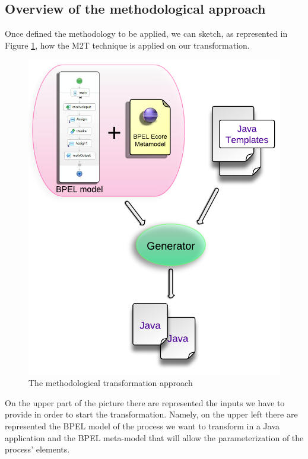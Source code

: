 \subsection{Overview of the methodological approach}
\label{MethodologyOverview}
Once defined the methodology to be applied, we can sketch, as represented in Figure \ref{fig:TransformationApproach}, how the M2T technique is applied on our transformation.
\begin{figure}[ht]
  \begin{center}
    \includegraphics[scale=0.9]{pictures/TransformationApproach.png}
    \caption{The methodological transformation approach}
    \label{fig:TransformationApproach}
  \end{center}
\end{figure}
On the upper part of the picture there are represented the inputs we have to provide in order to start the transformation. Namely, on the upper left there are represented the BPEL model of the process we want to transform in a Java application and the BPEL meta-model that will allow the parameterization of the process' elements. 
